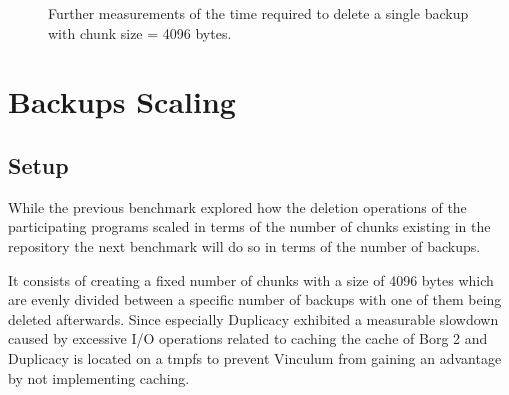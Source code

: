 \begin{figure}
    \centering
    \caption{Further measurements of the time required to delete a single backup with chunk size = 4096 bytes.}\label{fig:chunks-large}
\end{figure}

\section{Backups Scaling}\label{sec:backup-scaling}

\subsection{Setup}\label{sec:backup-scaling-setup}

While the previous benchmark explored how the deletion operations of the
participating programs scaled in terms of the number of chunks existing in the
repository the next benchmark will do so in terms of the number of backups.

It consists of creating a fixed number of chunks with a size of 4096 bytes which
are evenly divided between a specific number of backups with one of them being
deleted afterwards.
Since especially Duplicacy exhibited a measurable slowdown caused by excessive I/O
operations related to caching the cache of Borg 2 and Duplicacy is located on a
tmpfs to prevent Vinculum from gaining an advantage by not implementing caching.

